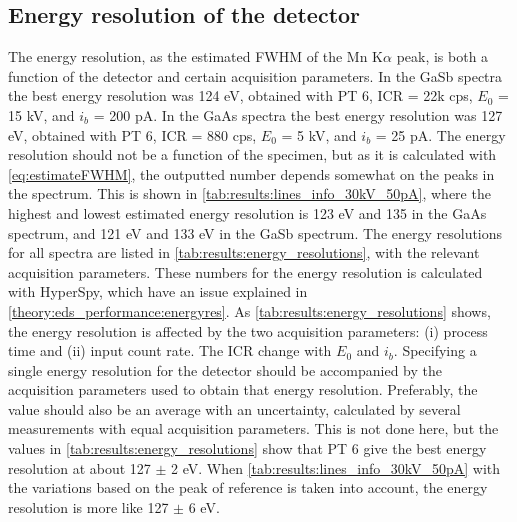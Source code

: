


\subsection*{Energy resolution of the detector}
\label{results:setup:energy_resolution}

The energy resolution, as the estimated FWHM of the Mn K$\alpha$ peak, is both a function of the detector and certain acquisition parameters.
In the GaSb spectra the best energy resolution was 124 eV, obtained with PT 6, ICR = 22k cps, $E_0$ = 15 kV, and $i_b$ = 200 pA.
In the GaAs spectra the best energy resolution was 127 eV, obtained with PT 6, ICR = 880 cps, $E_0$ = 5 kV, and $i_b$ = 25 pA.
The energy resolution should not be a function of the specimen, but as it is calculated with \cref{eq:estimateFWHM}, the outputted number depends somewhat on the peaks in the spectrum.
This is shown in \cref{tab:results:lines_info_30kV_50pA}, where the highest and lowest estimated energy resolution is 123 eV and 135 in the GaAs spectrum, and 121 eV and 133 eV in the GaSb spectrum.
The energy resolutions for all spectra are listed in \cref{tab:results:energy_resolutions}, with the relevant acquisition parameters.
These numbers for the energy resolution is calculated with HyperSpy, which have an issue explained in \cref{theory:eds_performance:energyres}.
As \cref{tab:results:energy_resolutions} shows, the energy resolution is affected by the two acquisition parameters: (i) process time and (ii) input count rate.
The ICR change with $E_0$ and $i_b$.
Specifying a single energy resolution for the detector should be accompanied by the acquisition parameters used to obtain that energy resolution.
Preferably, the value should also be an average with an uncertainty, calculated by several measurements with equal acquisition parameters.
This is not done here, but the values in \cref{tab:results:energy_resolutions} show that PT 6 give the best energy resolution at about 127 $\pm$ 2 eV.
When \cref{tab:results:lines_info_30kV_50pA} with the variations based on the peak of reference is taken into account, the energy resolution is more like 127 $\pm$ 6 eV.



